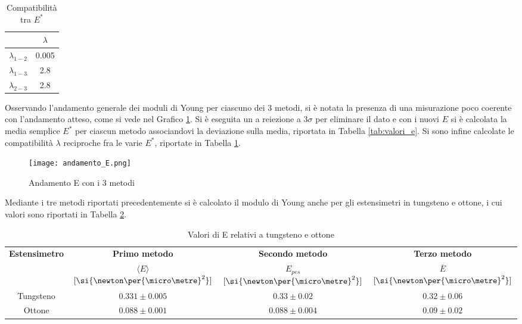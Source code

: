 \documentclass[a4paper,11pt,oneside]{article}
\begin{document}
\newpage
\begin{table}
\centering
    \begin{tabular}{|c|c|}
        \hline
        & $\lambda$\\ \hline
        {\cellcolor[rgb]{0.85,0.85,0.85}}$\lambda_{1-2}$ & {\cellcolor[rgb]{0.85,0.85,0.85}}0.005\\ \hline
        $\lambda_{1-3}$ & 2.8\\ \hline
        {\cellcolor[rgb]{0.85,0.85,0.85}}$\lambda_{2-3}$ & {\cellcolor[rgb]{0.85,0.85,0.85}}2.8 \\ \hline
    \end{tabular}
\caption{Compatibilità tra $E^{\ast}$}
\label{tab:compatibilità_e_star}
\end{table}

Osservando l'andamento generale dei moduli di Young per ciascuno dei 3 metodi, si è notata la presenza di una misurazione poco coerente con l'andamento atteso, come si vede nel Grafico \ref{fig:andamento_e}.
Si è eseguita un a reiezione a $3\sigma$ per eliminare il dato e con i nuovi $E$ si è calcolata la media semplice $E^{\ast}$ per ciascun metodo associandovi la deviazione sulla media, riportata in Tabella \ref{tab:valori_e}. Si sono infine calcolate le compatibilità $\lambda$ reciproche fra le varie $E^{\ast}$, riportate in Tabella \ref{tab:compatibilità_e_star}.



\begin{figure}[h!]
    \centering
        \caption{Andamento E con i 3 metodi}
        \label{fig:andamento_e}
        \texttt{[image: andamento\_E.png]}
\end{figure}


Mediante i tre metodi riportati precedentemente si è calcolato il modulo di Young anche per gli estensimetri in tungsteno e ottone, i cui valori sono riportati in Tabella \ref{tab:tungsteno_ottone}.



\begin{table}[h!]
    \centering
    \caption{Valori di E relativi a tungsteno e ottone}
    \label{tab:tungsteno_ottone}
    \begin{tabular}{|c|c|c|c|}
        \hline
        \multirow{2}{*}{\textbf{Estensimetro}} & \textbf{Primo metodo} & \textbf{Secondo metodo} & \textbf{Terzo metodo} \\
		& $\langle E \rangle$ $[\si{\newton\per{\micro\metre}^2}]$ &    $E_{pes}$ $[\si{\newton\per{\micro\metre}^2}]$ &  $\overline{E}$ $[\si{\newton\per{\micro\metre}^2}]$\\  \hline
        {\cellcolor[rgb]{0.85,0.85,0.85}}Tungsteno & {\cellcolor[rgb]{0.85,0.85,0.85}}$0.331 \pm 0.005$ & {\cellcolor[rgb]{0.85,0.85,0.85}}$0.33 \pm 0.02$ & {\cellcolor[rgb]{0.85,0.85,0.85}}$0.32 \pm 0.06$\\ \hline
        Ottone & $0.088 \pm 0.001$ & $0.088 \pm 0.004$ & $0.09 \pm 0.02$\\ \hline
    \end{tabular}
\end{table}
\end{document}
